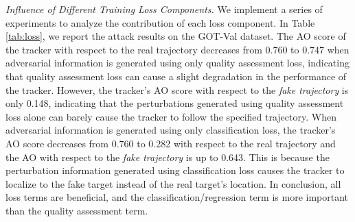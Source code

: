 \documentclass[journal]{IEEEtran}
\begin{document}
\textit{Influence of Different Training Loss Components.} We implement a series of experiments to analyze the contribution of each loss component. In Table \ref{tab:loss}, we report the attack results on the GOT-Val dataset. The AO score of the tracker with respect to the real trajectory decreases from 0.760 to 0.747 when adversarial information is generated using only quality assessment loss, indicating that quality assessment loss can cause a slight degradation in the performance of the tracker.
However, the tracker's AO score with respect to the \textit{fake trajectory} is only 0.148, indicating that the perturbations generated using quality assessment loss alone can barely cause the tracker to follow the specified trajectory.
When adversarial information is generated using only classification loss, the tracker's AO score decreases from 0.760 to 0.282 with respect to the real trajectory and the AO with respect to the \textit{fake trajectory} is up to 0.643. This is because the perturbation information generated using classification loss causes the tracker to localize to the fake target instead of the real target's location. In conclusion, all loss terms are beneficial, and the classification/regression term is more important than the quality assessment term.
\end{document}
